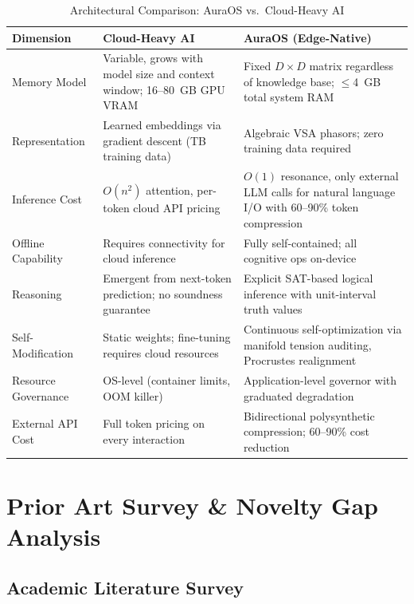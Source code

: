 \documentclass[11pt]{article}
\begin{document}
\begin{table}[H]
\centering
\caption{Architectural Comparison: AuraOS vs.\ Cloud-Heavy AI}
\label{tab:comparison}
\begin{tabular}{p{}p{}p{}}
\toprule
\textbf{Dimension} & \textbf{Cloud-Heavy AI} & \textbf{AuraOS (Edge-Native)} \\
\midrule
Memory Model & Variable, grows with model size and context window; 16--80~GB GPU VRAM & Fixed $D \times D$ matrix regardless of knowledge base; $\leq$4~GB total system RAM \\
Representation & Learned embeddings via gradient descent (TB training data) & Algebraic VSA phasors; zero training data required \\
Inference Cost & $O(n^2)$ attention, per-token cloud API pricing & $O(1)$ resonance, only external LLM calls for natural language I/O with 60--90\% token compression \\
Offline Capability & Requires connectivity for cloud inference & Fully self-contained; all cognitive ops on-device \\
Reasoning & Emergent from next-token prediction; no soundness guarantee & Explicit SAT-based logical inference with unit-interval truth values \\
Self-Modification & Static weights; fine-tuning requires cloud resources & Continuous self-optimization via manifold tension auditing, Procrustes realignment \\
Resource Governance & OS-level (container limits, OOM killer) & Application-level governor with graduated degradation \\
External API Cost & Full token pricing on every interaction & Bidirectional polysynthetic compression; 60--90\% cost reduction \\
\bottomrule
\end{tabular}
\end{table}

\section{Prior Art Survey \& Novelty Gap Analysis}

\subsection{Academic Literature Survey}
\end{document}
